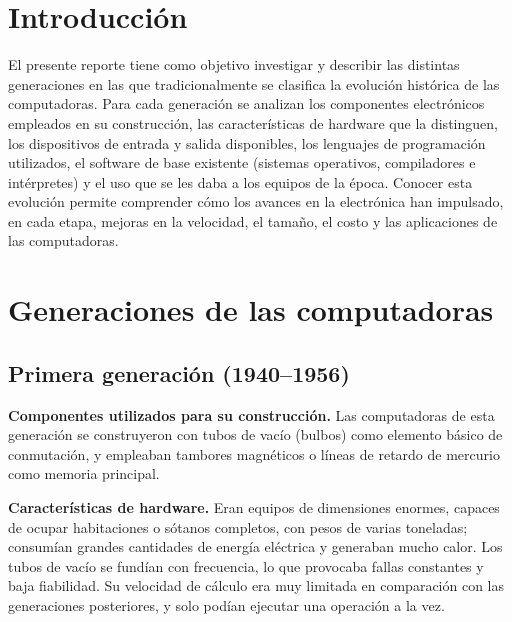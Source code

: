\documentclass[12pt,letterpaper]{article}
\begin{document}
\tableofcontents
\newpage

\section{Introducción}

El presente reporte tiene como objetivo investigar y describir las distintas generaciones en las que tradicionalmente se clasifica la evolución histórica de las computadoras. Para cada generación se analizan los componentes electrónicos empleados en su construcción, las características de hardware que la distinguen, los dispositivos de entrada y salida disponibles, los lenguajes de programación utilizados, el software de base existente (sistemas operativos, compiladores e intérpretes) y el uso que se les daba a los equipos de la época. Conocer esta evolución permite comprender cómo los avances en la electrónica han impulsado, en cada etapa, mejoras en la velocidad, el tamaño, el costo y las aplicaciones de las computadoras.

\section{Generaciones de las computadoras}

\subsection{Primera generación (1940--1956)}

\textbf{Componentes utilizados para su construcción.} Las computadoras de esta generación se construyeron con tubos de vacío (bulbos) como elemento básico de conmutación, y empleaban tambores magnéticos o líneas de retardo de mercurio como memoria principal.

\textbf{Características de hardware.} Eran equipos de dimensiones enormes, capaces de ocupar habitaciones o sótanos completos, con pesos de varias toneladas; consumían grandes cantidades de energía eléctrica y generaban mucho calor. Los tubos de vacío se fundían con frecuencia, lo que provocaba fallas constantes y baja fiabilidad. Su velocidad de cálculo era muy limitada en comparación con las generaciones posteriores, y solo podían ejecutar una operación a la vez.
\end{document}
